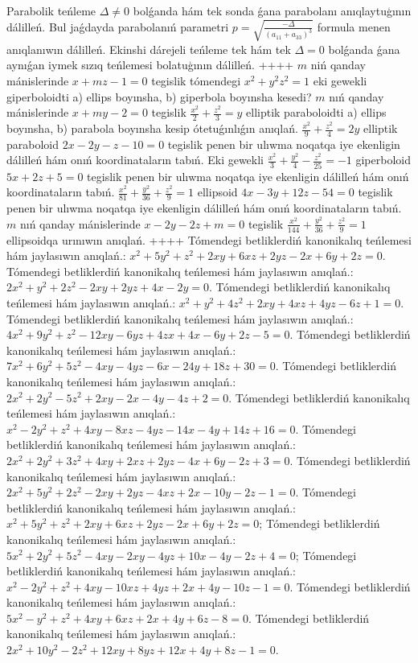 Parabolik teńleme $\Delta \neq 0$ bolǵanda hám tek sonda ǵana parabolanı anıqlaytuģının dálilleń. Bul jaǵdayda parabolanıń parametri $p=\sqrt{\frac{-\Delta}{ (a_{11}+a_{33}) ^3}}$ formula menen anıqlanıwın dálilleń.
Ekinshi dárejeli teńleme tek hám tek $\Delta=0$ bolǵanda ǵana aynıǵan iymek sızıq teńlemesi bolatuģının dálilleń.
++++
$m$ niń qanday mánislerinde $x+mz-1=0$ tegislik tómendegi $x^2+y^2z^2=1$ eki gewekli giperboloidti a) ellips boyınsha, b) giperbola boyınsha kesedi?
$m$ nıń qanday mánislerinde $x+m y-2=0$ tegislik $\frac{x^2}{2}+\frac{z^2}{3}=y$ elliptik paraboloidti a) ellips boyınsha, b) parabola boyınsha kesip ótetuǵınlıǵın anıqlań.
$\frac{x^2}{9}+\frac{z^2}{4}=2 y$ elliptik paraboloid $2 x-2 y-z-10=0$ tegislik penen bir ulıwma noqatqa iye ekenligin dálilleń hám onıń koordinataların tabıń.
Eki gewekli $\frac{x^2}{3}+\frac{y^2}{4}-\frac{z^2}{25}=-1$ giperboloid $5 x+2 z+5=0$ tegislik penen bir ulıwma noqatqa iye ekenligin dálilleń hám onıń koordinataların tabıń.
$\frac{x^2}{81}+\frac{y^2}{36}+\frac{z^2}{9}=1$ ellipsoid $4 x-3 y+12 z-54=0$ tegislik penen bir ulıwma noqatqa iye ekenligin dálilleń hám onıń koordinataların tabıń.
$m$ nıń qanday mánislerinde $x-2 y-2 z+m=0$ tegislik $\frac{x^2}{144}+\frac{y^2}{36}+\frac{z^2}{9}=1$ ellipsoidqa urınıwın anıqlań.
++++
Tómendegi betliklerdiń kanonikalıq teńlemesi hám jaylasıwın anıqlań.: $x^2+5 y^2+z^2+2 x y+6 x z+2 y z-2 x+6 y+2 z=0$.
Tómendegi betliklerdiń kanonikalıq teńlemesi hám jaylasıwın anıqlań.: $2 x^2+y^2+2 z^2-2 x y+2 y z+4 x-2 y=0$.
Tómendegi betliklerdiń kanonikalıq teńlemesi hám jaylasıwın anıqlań.: $x^2+y^2+4 z^2+2 x y+4 x z+4 y z-6 z+1=0$.
Tómendegi betliklerdiń kanonikalıq teńlemesi hám jaylasıwın anıqlań.: $4 x^2+9 y^2+z^2-12 x y-6 y z+4 z x+4 x-6 y+2 z-5=0$.
Tómendegi betliklerdiń kanonikalıq teńlemesi hám jaylasıwın anıqlań.: $7 x^2+6 y^2+5 z^2-4 x y-4 y z-6 x-24 y+18 z+30=0$.
Tómendegi betliklerdiń kanonikalıq teńlemesi hám jaylasıwın anıqlań.: $2 x^2+2 y^2-5 z^2+2 x y-2 x-4 y-4 z+2=0$.
Tómendegi betliklerdiń kanonikalıq teńlemesi hám jaylasıwın anıqlań.: $x^2-2 y^2+z^2+4 x y-8 x z-4 y z-14 x-4 y+14 z+16=0$.
Tómendegi betliklerdiń kanonikalıq teńlemesi hám jaylasıwın anıqlań.: $2 x^2+2 y^2+3 z^2+4 x y+2 x z+2 y z-4 x+6 y-2 z+3=0$.
Tómendegi betliklerdiń kanonikalıq teńlemesi hám jaylasıwın anıqlań.: $2 x^2+5 y^2+2 z^2-2 x y+2 y z-4 x z+2 x-10 y-2 z-1=0$.
Tómendegi betliklerdiń kanonikalıq teńlemesi hám jaylasıwın anıqlań.: $x^2+5 y^2+z^2+2 x y+6 x z+2 y z-2 x+6 y+2 z=0$;
Tómendegi betliklerdiń kanonikalıq teńlemesi hám jaylasıwın anıqlań.: $5 x^2+2 y^2+5 z^2-4 x y-2 x y-4 y z+10 x-4 y-2 z+4=0$;
Tómendegi betliklerdiń kanonikalıq teńlemesi hám jaylasıwın anıqlań.: $x^2-2 y^2+z^2+4 x y-10 x z+4 y z+2 x+4 y-10 z-1=0$.
Tómendegi betliklerdiń kanonikalıq teńlemesi hám jaylasıwın anıqlań.: $5 x^2-y^2+z^2+4 x y+6 x z+2 x+4 y+6 z-8=0$.
Tómendegi betliklerdiń kanonikalıq teńlemesi hám jaylasıwın anıqlań.: $2 x^2+10 y^2-2 z^2+12 x y+8 y z+12 x+4 y+8 z-1=0$.